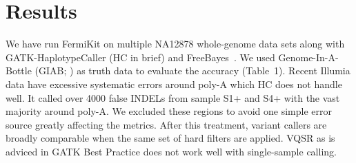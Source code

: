 \documentclass{bioinfo}
\begin{document}
\section{Results}
We have run FermiKit on multiple NA12878 whole-genome data sets along with
GATK-HaplotypeCaller (HC in brief) and FreeBayes~\citep{Garrison:2012aa}.
We used Genome-In-A-Bottle (GIAB; \citealt{Zook:2014ab}) as truth data
to evaluate the accuracy (Table~1). Recent Illumia data have excessive
systematic errors around poly-A which HC does not handle well. It called over
4000 false INDELs from sample S1+ and S4+ with the vast majority around poly-A.
We excluded these regions to avoid one simple error source greatly affecting
the metrics. After this treatment, variant callers are broadly comparable when
the same set of hard filters are applied. VQSR as is adviced in GATK Best
Practice does not work well with single-sample calling.
\end{document}
